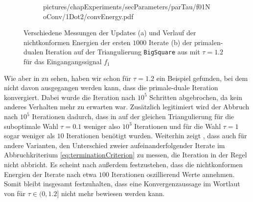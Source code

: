 \begin{figure}[p]
\begin{subfigure}[b]{.47\linewidth}
      {pictures/chapExperiments/secParameters/parTau/f01NoConv/1Dot2/convEnergy.pdf}
    \label{fig:parTauNoConvergenceEnergy}
  \end{subfigure}
  \caption{Verschiedene Messungen der Updates (a) und Verlauf der nichtkonformen
    Energien der ersten $1000$ Iterate (b) der primalen-dualen Iteration auf
    der Triangulierung \texttt{BigSquare} aus  mit
    $\tau=1.2$ für das Eingangangssignal $f_1$}
  \label{fig:parTauNoConvergence}
\end{figure}
Wie aber in  zu sehen, haben wir schon für
$\tau=1.2$ ein Beispiel gefunden, bei dem nicht davon ausgegangen werden kann,
dass die primale-duale Iteration konvergiert.
Dabei wurde die Iteration nach $10^5$ Schritten abgebrochen, da kein anderes
Verhalten mehr zu erwarten war.
Zusätzlich legitimiert wird der Abbruch nach $10^5$ Iterationen dadurch, dass
in  auf der gleichen Triangulierung für die
suboptimale Wahl $\tau = 0.1$ weniger also $10^3$ Iterationen und für die Wahl
$\tau=1$ sogar weniger als $10$ Iterationen benötigt wurden.
Weiterhin zeigt , dass auch für andere
Varianten, den Unterschied zweier aufeinanderfolgender Iterate im
Abbruchkriterium \eqref{eq:terminationCriterion} zu messen, die Iteration in
der Regel nicht abbricht.
Es scheint nach  außerdem festzustehen,
dass die nichtkonformen Energien der Iterate nach etwa $100$ Iterationen
oszillierend Werte annehmen.
Somit bleibt insgesamt festzuhalten, dass eine Konvergenzaussage im Wortlaut
von  für $\tau\in(0,1.2]$ nicht mehr bewiesen
werden kann.

